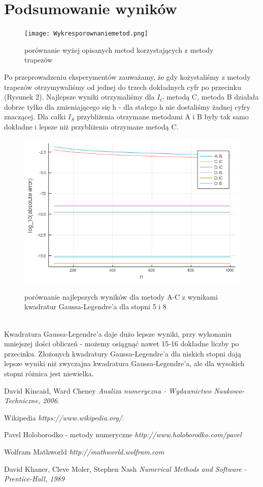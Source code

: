 \documentclass{article}
\begin{document}
\section*{Podsumowanie wyników}
\begin{figure}[ht]
    \texttt{[image: Wykresporownaniemetod.png]}
    \label{wykresABC}
    \caption{porównanie wyżej opisanych metod korzystających z metody trapezów}
\end{figure}
Po przeprowadzeniu eksperymentów zauważamy, że gdy kożystaliśmy z metody trapezów otrzymywaliśmy od jednej do trzech dokładnych cyfr po przecinku (Rysunek 2). Najlepsze wyniki otrzymaliśmy dla $I_C$ metodą C, metoda B działała dobrze tylko dla zmieniającego się h - dla stałego h nie dostaliśmy żadnej cyfry znaczącej. Dla całki $I_S$ przybliżenia otrzymane metodami A i B były tak samo dokładne i lepsze niż przybliżenia otrzymane metodą C.
\begin{figure}[ht]
    \includegraphics[scale=0.5]{WykresporownaniemetodABC-D.png}
    \label{wykresABC-D}
    \caption{porównanie najlepszych wyników dla metody A-C z wynikami kwadratur Gaussa-Legendre'a dla stopni 5 i 8}
\end{figure}\\
Kwadratura Gaussa-Legendre'a daje dużo lepsze wyniki, przy wykonaniu mniejszej ilości obliczeń - możemy osiągnąć nawet 15-16 dokładne liczby po przecinku. Złożonych kwadratury Gaussa-Legendre'a dla niskich stopni dają lepsze wyniki niż zwyczajna kwadratura Gaussa-Legendre'a, ale dla wysokich stopni różnica jest niewielka.
\begin{thebibliography}{9}

  
  David Kincaid, Ward Cheney
  \emph{Analiza numeryczna - Wydawnictwo Naukowo-Techniczne, 2006}.

  Wikipedia
  \emph{https://www.wikipedia.org/}.

	Pavel Holoborodko - metody numeryczne
		\emph{http://www.holoborodko.com/pavel}

	Wolfram Mathworld
		\emph{http://mathworld.wolfram.com}

	David Khaner, Cleve Moler, Stephen Nash
	\emph{Numerical Methods and Software - Prentice-Hall, 1989}
\end{thebibliography}
\end{document}
